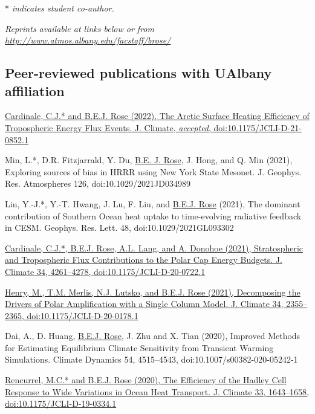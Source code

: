 \documentclass[11pt, letterpaper]{article} %
\newcommand{\years}[1]{\marginnote{\scriptsize #1}} %
\newcommand{\publink}{http://www.atmos.albany.edu/facstaff/brose/resources/Publications/}
\begin{document}
* \emph{indicates student co-author.}

\emph{Reprints available at links below or from \url{http://www.atmos.albany.edu/facstaff/brose/}}

\subsection*{Peer-reviewed publications with UAlbany affiliation}  

\years{2022}
\href{\publink Cardinale_Rose_JClim2022accepted.pdf}{Cardinale, C.J.* and \underline{B.E.J. Rose} (2022), The Arctic Surface Heating Efficiency of Tropospheric Energy Flux Events. J. Climate, \emph{accepted}, doi:10.1175/JCLI-D-21-0852.1}
\vspace{0.2 cm} 

\years{2021}
Min, L.*, D.R. Fitzjarrald, Y. Du, \underline{B.E. J. Rose}, J. Hong, and Q. Min (2021), Exploring sources of bias in HRRR using New York State Mesonet. J. Geophys. Res. Atmospheres 126, doi:10.1029/2021JD034989
\vspace{0.2 cm}

Lin, Y.-J.*, Y.-T. Hwang, J. Lu, F. Liu, and \underline{B.E.J. Rose} (2021), The dominant contribution of Southern Ocean heat uptake to time-evolving radiative feedback in CESM. Geophys. Res. Lett. 48, doi:10.1029/2021GL093302
\vspace{0.2 cm}

\href{\publink Cardinale_etal_JClim2021.pdf}{Cardinale, C.J.*, \underline{B.E.J. Rose}, A.L. Lang, and A. Donohoe (2021), Stratospheric and Tropospheric Flux Contributions to the Polar Cap Energy Budgets. J. Climate 34, 4261--4278, doi:10.1175/JCLI-D-20-0722.1}
\vspace{0.2 cm}

\href{\publink Henry_etal_JClim2021.pdf}{Henry, M., T.M. Merlis, N.J. Lutsko, and \underline{B.E.J. Rose} (2021), Decomposing the Drivers of Polar Amplification with a Single Column Model. J. Climate 34, 2355--2365, doi:10.1175/JCLI-D-20-0178.1}
\vspace{0.2 cm}

\years{2020} 
Dai, A., D. Huang, \underline{B.E.J. Rose}, J. Zhu and X. Tian (2020), Improved Methods for Estimating Equilibrium Climate Sensitivity from Transient Warming Simulations. Climate Dynamics 54, 4515--4543, doi:10.1007/s00382-020-05242-1
\vspace{0.2 cm}

\href{\publink Rencurrel_Rose_JClim2020.pdf}{Rencurrel, M.C.* and \underline{B.E.J. Rose} (2020), The Efficiency of the Hadley Cell Response to Wide Variations in Ocean Heat Transport. J. Climate 33, 1643--1658, doi:10.1175/JCLI-D-19-0334.1}
\vspace{0.2 cm}
\end{document}
